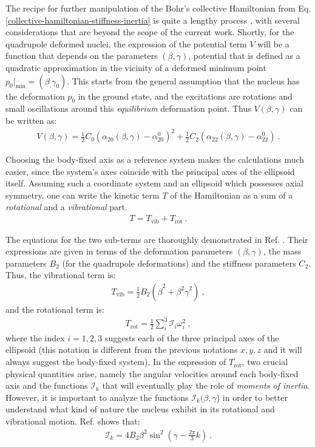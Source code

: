 The recipe for further manipulation of the Bohr's collective Hamiltonian from Eq. \ref{collective-hamiltonian-stiffness-inertia} is quite a lengthy process \cite{bohr1998nuclear,ring2004nuclear}, with several considerations that are beyond the scope of the current work. Shortly, for the quadrupole deformed nuclei, the expression of the potential term $V$ will be a function that depends on the parameters $(\beta,\gamma)$, potential that is defined as a quadratic approximation in the vicinity of a deformed minimum point $p_0|_\text{min}=(\beta_,\gamma_0)$. This starts from the general assumption that the nucleus has the deformation $p_0$ in the ground state, and the excitations are rotations and small oscillations around this \emph{equilibrium} deformation point. Thus $V(\beta,\gamma)$ can be written as:
\begin{align}
    V(\beta,\gamma)=\frac{1}{2}C_{0}\left(\alpha_{20}(\beta,\gamma)-\alpha_{20}^0\right)^2+\frac{1}{2}C_{2}\left(\alpha_{22}(\beta,\gamma)-\alpha_{22}^0\right)\ .
    \label{bohr-collective-potential}
\end{align}

Choosing the body-fixed axis as a reference system makes the calculations much easier, since the system's axes coincide with the principal axes of the ellipsoid itself. Assuming such a coordinate system and an ellipsoid which possesses axial symmetry, one can write the kinetic term $T$ of the Hamiltonian as a sum of a \emph{rotational} and a \emph{vibrational} part.
\begin{align}
    T=T_\text{vib}+T_\text{rot}\ .
\end{align}

The equations for the two sub-terms are thoroughly demonstrated in Ref. \cite{li2022model}. Their expressions are given in terms of the deformation parameters $(\beta,\gamma)$, the mass parameters $B_2$ (for the quadrupole deformations) and the stiffness parameters $C_2$. Thus, the vibrational term is:
\begin{align}
    T_\text{vib}=\frac{1}{2}B_2\left(\dot{\beta}^2+\beta^2\dot{\gamma}^2\right)\ ,
    \label{kinetic-vibrational-energy-collective}
\end{align}
and the rotational term is:
\begin{align}
    T_\text{rot}=\frac{1}{2}\sum_i^3\mathcal{I}_i\omega_i^2\ ,
    \label{kinetic-rotational-energy-collective}
\end{align}
where the index $i=1,2,3$ suggests each of the three principal axes of the ellipsoid (this notation is different from the previous notations $x,y,z$ and it will always suggest the body-fixed system). In the expression of $T_\text{rot}$, two crucial physical quantities arise, namely the angular velocities around each body-fixed axis and the functions $\mathcal{I}_k$ that will eventually play the role of \emph{moments of inertia}. However, it is important to analyze the functions $\mathcal{I}_k(\beta,\gamma$) in order to better understand what kind of nature the nucleus exhibit in its rotational and vibrational motion. Ref. \cite{ring2004nuclear} shows that:
\begin{align}
    \mathcal{I}_k=4B_2\beta^2\sin^2\left(\gamma-\frac{2\pi}{3}k\right)\ .
\end{align}

